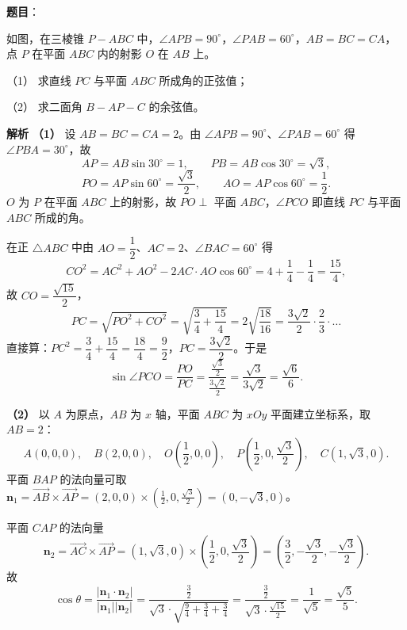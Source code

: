 \begin{answer}

\textbf{题目}：

如图，在三棱锥 $P-ABC$ 中，$\angle APB=90^\circ$，$\angle PAB=60^\circ$，$AB=BC=CA$，点 $P$ 在平面 $ABC$ 内的射影 $O$ 在 $AB$ 上。

（1） 求直线 $PC$ 与平面 $ABC$ 所成角的正弦值；

（2） 求二面角 $B-AP-C$ 的余弦值。
\nopagebreak[4]
\begin{center}\end{center}
\nopagebreak[4]
\textbf{解析}
\textbf{（1）} 设 $AB=BC=CA=2$。由 $\angle APB=90^\circ$、$\angle PAB=60^\circ$ 得 $\angle PBA=30^\circ$，故
\nopagebreak[4]
\[AP=AB\sin30^\circ=1,\qquad PB=AB\cos30^\circ=\sqrt3,\]
\nopagebreak[4]
\[PO=AP\sin60^\circ=\frac{\sqrt3}2,\qquad AO=AP\cos60^\circ=\frac12.\]
$O$ 为 $P$ 在平面 $ABC$ 上的射影，故 $PO\perp$ 平面 $ABC$，$\angle PCO$ 即直线 $PC$ 与平面 $ABC$ 所成的角。

在正 $\triangle ABC$ 中由 $AO=\dfrac12$、$AC=2$、$\angle BAC=60^\circ$ 得
\nopagebreak[4]
\[CO^2=AC^2+AO^2-2AC\cdot AO\cos60^\circ=4+\frac14-\frac14=\frac{15}4,\]
故 $CO=\dfrac{\sqrt{15}}2$，
\nopagebreak[4]
\[PC=\sqrt{PO^2+CO^2}=\sqrt{\frac34+\frac{15}4}=2\sqrt{\frac{18}{16}}=\frac{3\sqrt2}2\cdot\frac{2}{3}\cdot\ldots\]
直接算：$PC^2=\dfrac34+\dfrac{15}4=\dfrac{18}4=\dfrac92$，$PC=\dfrac{3\sqrt2}2$。于是
\nopagebreak[4]
\[\sin\angle PCO=\frac{PO}{PC}=\frac{\frac{\sqrt3}2}{\frac{3\sqrt2}2}=\frac{\sqrt3}{3\sqrt2}=\frac{\sqrt6}6.\]

\textbf{（2）} 以 $A$ 为原点，$AB$ 为 $x$ 轴，平面 $ABC$ 为 $xOy$ 平面建立坐标系，取 $AB=2$：
\nopagebreak[4]
\[A(0,0,0),\quad B(2,0,0),\quad O\left(\frac12,0,0\right),\quad P\left(\frac12,0,\frac{\sqrt3}2\right),\quad C\left(1,\sqrt3,0\right).\]
平面 $BAP$ 的法向量可取 $\boldsymbol n_1=\overrightarrow{AB}\times\overrightarrow{AP}=(2,0,0)\times\left(\frac12,0,\frac{\sqrt3}2\right)=\left(0,-\sqrt3,0\right)$。

平面 $CAP$ 的法向量
\nopagebreak[4]
\[\boldsymbol n_2=\overrightarrow{AC}\times\overrightarrow{AP}=(1,\sqrt3,0)\times\left(\frac12,0,\frac{\sqrt3}2\right)=\left(\frac32,-\frac{\sqrt3}2,-\frac{\sqrt3}2\right).\]
故
\nopagebreak[4]
\[\cos\theta=\frac{\left|\boldsymbol n_1\cdot\boldsymbol n_2\right|}{|\boldsymbol n_1||\boldsymbol n_2|}=\frac{\frac32}{\sqrt3\cdot\sqrt{\frac94+\frac34+\frac34}}=\frac{\frac32}{\sqrt3\cdot\frac{\sqrt{15}}2}=\frac{1}{\sqrt5}=\frac{\sqrt5}5.\]



\end{answer}
